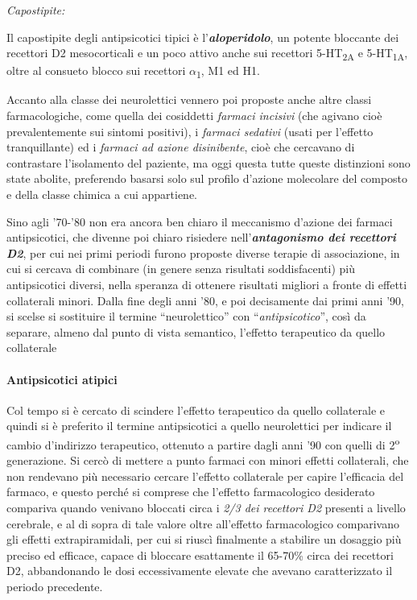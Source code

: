 \emph{\emph{Capostipite:}}

Il capostipite degli antipsicotici tipici è
l'\textbf{\emph{aloperidolo}}, un potente bloccante dei recettori D2
mesocorticali e un poco attivo anche sui recettori
5-HT\textsubscript{2A} e 5-HT\textsubscript{1A}, oltre al consueto
blocco sui recettori $\alpha$\textsubscript{1}, M1 ed H1.

Accanto alla classe dei neurolettici vennero poi proposte anche altre
classi farmacologiche, come quella dei cosiddetti \emph{farmaci
incisivi} (che agivano cioè prevalentemente sui sintomi positivi), i
\emph{farmaci sedativi} (usati per l'effetto tranquillante) ed i
\emph{farmaci ad azione disinibente}, cioè che cercavano di contrastare
l'isolamento del paziente, ma oggi questa tutte queste distinzioni sono
state abolite, preferendo basarsi solo sul profilo d'azione molecolare
del composto e della classe chimica a cui appartiene.

Sino agli '70-'80 non era ancora ben chiaro il meccanismo d'azione dei
farmaci antipsicotici, che divenne poi chiaro risiedere
nell'\textbf{\emph{antagonismo dei recettori D2}}, per cui nei primi
periodi furono proposte diverse terapie di associazione, in cui si
cercava di combinare (in genere senza risultati soddisfacenti) più
antipsicotici diversi, nella speranza di ottenere risultati migliori a
fronte di effetti collaterali minori. Dalla fine degli anni '80, e poi
decisamente dai primi anni '90, si scelse si sostituire il termine
``neurolettico'' con ``\emph{antipsicotico}'', così da separare, almeno
dal punto di vista semantico, l'effetto terapeutico da quello
collaterale

\paragraph{Antipsicotici atipici}

Col tempo si è cercato di scindere l'effetto terapeutico da quello
collaterale e quindi si è preferito il termine antipsicotici a quello
neurolettici per indicare il cambio d'indirizzo terapeutico, ottenuto a
partire dagli anni '90 con quelli di 2\textsuperscript{o} generazione. Si cercò di mettere
a punto farmaci con minori effetti collaterali, che non rendevano più
necessario cercare l'effetto collaterale per capire l'efficacia del
farmaco, e questo perché si comprese che l'effetto farmacologico
desiderato compariva quando venivano bloccati circa i \emph{2/3 dei
recettori D2} presenti a livello cerebrale, e al di sopra di tale valore
oltre all'effetto farmacologico comparivano gli effetti extrapiramidali,
per cui si riuscì finalmente a stabilire un dosaggio più preciso ed
efficace, capace di bloccare esattamente il 65-70\% circa dei recettori
D2, abbandonando le dosi eccessivamente elevate che avevano
caratterizzato il periodo precedente.

